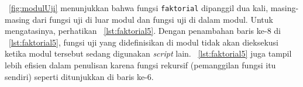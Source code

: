 \figurename~\ref{fig:modulUji} menunjukkan bahwa fungsi \texttt{faktorial} dipanggil dua kali, masing-masing dari fungsi uji di luar modul dan fungsi uji di dalam modul. Untuk mengatasinya, perhatikan \lstlistingname~\ref{lst:faktorial5}. Dengan penambahan baris ke-8 di \lstlistingname~\ref{lst:faktorial5}, fungsi uji yang didefinisikan di modul tidak akan dieksekusi ketika modul tersebut sedang digunakan \textit{script} lain. \lstlistingname~\ref{lst:faktorial5} juga tampil lebih efisien dalam penulisan karena fungsi rekursif (pemanggilan fungsi itu sendiri) seperti ditunjukkan di baris ke-6.


